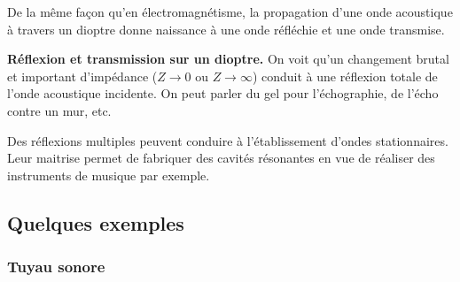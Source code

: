 De la même façon qu'en électromagnétisme, la propagation d'une onde acoustique à travers un dioptre donne naissance à une onde réfléchie et une onde transmise.
\begin{slide}
\textbf{Réflexion et transmission sur un dioptre.}
On voit qu'un changement brutal et important d'impédance ($Z\rightarrow 0$ ou $Z\rightarrow \infty$) conduit à une réflexion totale de l'onde acoustique incidente.
On peut parler du gel pour l'échographie, de l'écho contre un mur, etc.
\end{slide}

\begin{transition}
Des réflexions multiples peuvent conduire à l'établissement d'ondes stationnaires.
Leur maitrise permet de fabriquer des cavités résonantes en vue de réaliser des instruments de musique par exemple.
\end{transition}

\subsection{Quelques exemples}

\subsubsection{Tuyau sonore}

